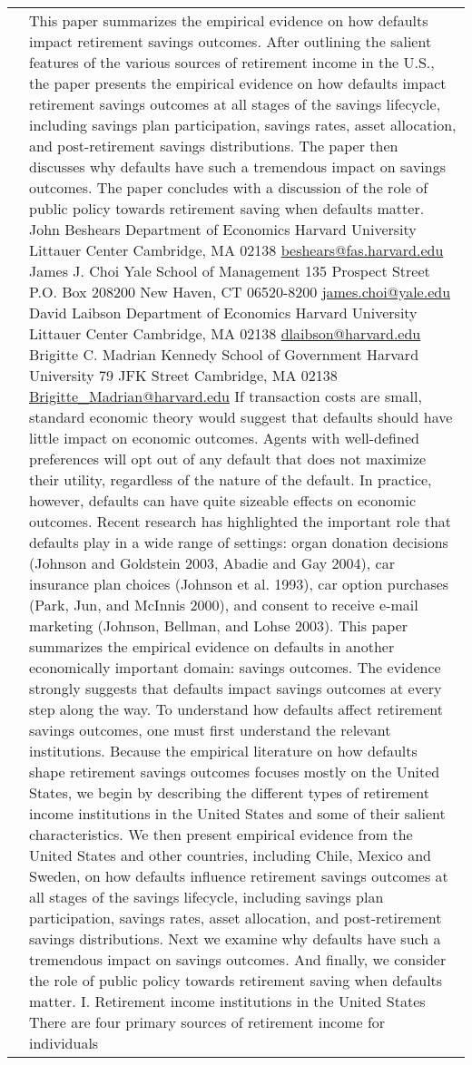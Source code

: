 \documentclass{article}
\begin{document}
\begin{tabular}{p{}p{}}
\cite{Beshears_2009} & This paper summarizes the empirical evidence on how defaults impact retirement savings outcomes. After outlining the salient features of the various sources of retirement income in the U.S., the paper presents the empirical evidence on how defaults impact retirement savings outcomes at all stages of the savings lifecycle, including savings plan participation, savings rates, asset allocation, and post-retirement savings distributions. The paper then discusses why defaults have such a tremendous impact on savings outcomes. The paper concludes with a discussion of the role of public policy towards retirement saving when defaults matter. John Beshears Department of Economics Harvard University Littauer Center Cambridge, MA 02138 \href{mailto:beshears@fas.harvard.edu}{beshears@fas.harvard.edu} James J. Choi Yale School of Management 135 Prospect Street P.O. Box 208200 New Haven, CT 06520-8200 \href{mailto:james.choi@yale.edu}{james.choi@yale.edu} David Laibson Department of Economics Harvard University Littauer Center Cambridge, MA 02138 \href{mailto:dlaibson@harvard.edu}{dlaibson@harvard.edu} Brigitte C. Madrian Kennedy School of Government Harvard University 79 JFK Street Cambridge, MA 02138 \href{mailto:Brigitte\_Madrian@harvard.edu}{Brigitte\_Madrian@harvard.edu} If transaction costs are small, standard economic theory would suggest that defaults should have little impact on economic outcomes. Agents with well-defined preferences will opt out of any default that does not maximize their utility, regardless of the nature of the default. In practice, however, defaults can have quite sizeable effects on economic outcomes. Recent research has highlighted the important role that defaults play in a wide range of settings: organ donation decisions (Johnson and Goldstein 2003, Abadie and Gay 2004), car insurance plan choices (Johnson et al. 1993), car option purchases (Park, Jun, and McInnis 2000), and consent to receive e-mail marketing (Johnson, Bellman, and Lohse 2003). This paper summarizes the empirical evidence on defaults in another economically important domain: savings outcomes. The evidence strongly suggests that defaults impact savings outcomes at every step along the way. To understand how defaults affect retirement savings outcomes, one must first understand the relevant institutions. Because the empirical literature on how defaults shape retirement savings outcomes focuses mostly on the United States, we begin by describing the different types of retirement income institutions in the United States and some of their salient characteristics. We then present empirical evidence from the United States and other countries, including Chile, Mexico and Sweden, on how defaults influence retirement savings outcomes at all stages of the savings lifecycle, including savings plan participation, savings rates, asset allocation, and post-retirement savings distributions. Next we examine why defaults have such a tremendous impact on savings outcomes. And finally, we consider the role of public policy towards retirement saving when defaults matter. I. Retirement income institutions in the United States There are four primary sources of retirement income for individuals 
\end{tabular}
\end{document}
